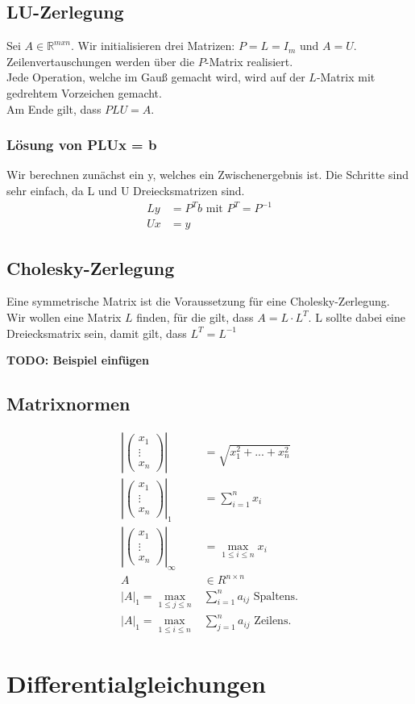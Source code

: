 \documentclass[a4paper, landscape, 10pt]{article}
\newcommand{\bspVec}{\ensuremath{\begin{pmatrix} x_1\\ \vdots \\ x_n \end{pmatrix}}}
\begin{document}
\begin{multicols}{4}
\begin{small}
		\subsection{LU-Zerlegung}
			Sei $A \in \mathbb{R}^{mxn}$. Wir initialisieren drei Matrizen: $P = L = I_m$ und $A = U$.\\
			Zeilenvertauschungen werden über die $P$-Matrix realisiert. \\
			Jede Operation, welche im Gauß gemacht wird, wird auf der $L$-Matrix mit gedrehtem Vorzeichen gemacht.\\
			Am Ende gilt, dass $PLU = A$.
			\subsubsection{Lösung von PLUx = b}
				Wir berechnen zunächst ein y, welches ein Zwischenergebnis ist. Die Schritte sind sehr einfach, da L und U Dreiecksmatrizen sind.
				\begin{align*}
					Ly &= P^Tb \text{ mit } P^T = P^{-1}\\
					Ux &= y
				\end{align*}
		\subsection{Cholesky-Zerlegung}
			Eine symmetrische Matrix ist die Voraussetzung für eine Cholesky-Zerlegung.
			Wir wollen eine Matrix $L$ finden, für die gilt, dass $A = L \cdot L^{T}$. L sollte dabei eine Dreiecksmatrix sein, damit gilt, dass $L^T = L^{-1}$
			
			\textbf{TODO: Beispiel einfügen}
		\subsection{Matrixnormen}
			\begin{align*}
				\left|\bspVec\right| &= \sqrt{x_1^2 + ... + x_n^2}\\
				\left|\bspVec\right|_1 &= \sum_{i = 1}^{n} x_i\\
				\left|\bspVec\right|_\infty &= \max_{1 \le i \le n} x_i\\
				A &\in R^{n \times n}\\
				\left|A\right|_1 = \max_{1 \le j \le n} &\sum_{i = 1}^{n} a_{ij} \text{ Spaltens.} \\
				\left|A\right|_1 = \max_{1 \le i \le n} &\sum_{j = 1}^{n} a_{ij} \text{ Zeilens.} 
			\end{align*}
	\section{Differentialgleichungen}

\end{small}
\end{multicols}
\end{document}
